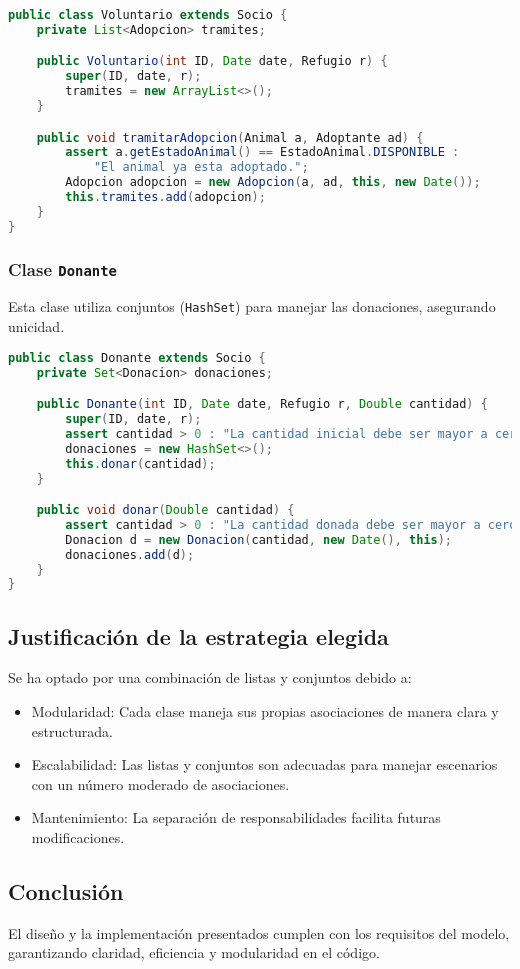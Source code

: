 \begin{lstlisting}[language=Java]
public class Voluntario extends Socio {
    private List<Adopcion> tramites;

    public Voluntario(int ID, Date date, Refugio r) {
        super(ID, date, r);
        tramites = new ArrayList<>();
    }

    public void tramitarAdopcion(Animal a, Adoptante ad) {
        assert a.getEstadoAnimal() == EstadoAnimal.DISPONIBLE :
            "El animal ya esta adoptado.";
        Adopcion adopcion = new Adopcion(a, ad, this, new Date());
        this.tramites.add(adopcion);
    }
}
\end{lstlisting}

\subsubsection{Clase \texttt{Donante}}
Esta clase utiliza conjuntos (\texttt{HashSet}) para manejar las donaciones, asegurando unicidad.

\begin{lstlisting}[language=Java]
public class Donante extends Socio {
    private Set<Donacion> donaciones;

    public Donante(int ID, Date date, Refugio r, Double cantidad) {
        super(ID, date, r);
        assert cantidad > 0 : "La cantidad inicial debe ser mayor a cero.";
        donaciones = new HashSet<>();
        this.donar(cantidad);
    }

    public void donar(Double cantidad) {
        assert cantidad > 0 : "La cantidad donada debe ser mayor a cero.";
        Donacion d = new Donacion(cantidad, new Date(), this);
        donaciones.add(d);
    }
}
\end{lstlisting}

\subsection{Justificación de la estrategia elegida}
Se ha optado por una combinación de listas y conjuntos debido a:
\begin{itemize}
    \item Modularidad: Cada clase maneja sus propias asociaciones de manera clara y estructurada.
    \item Escalabilidad: Las listas y conjuntos son adecuadas para manejar escenarios con un número moderado de asociaciones.
    \item Mantenimiento: La separación de responsabilidades facilita futuras modificaciones.
\end{itemize}

\subsection{Conclusión}
El diseño y la implementación presentados cumplen con los requisitos del modelo, garantizando claridad, eficiencia y modularidad en el código.